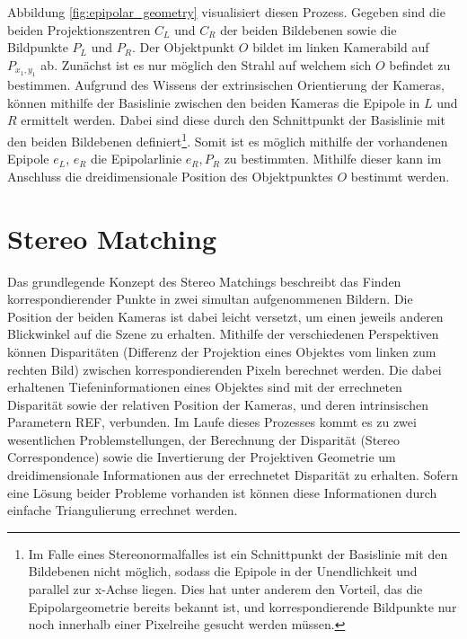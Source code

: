 Abbildung \ref{fig:epipolar_geometry} visualisiert diesen Prozess. Gegeben sind die beiden Projektionszentren $C_L$ und $C_R$ der beiden Bildebenen sowie die Bildpunkte $P_L$ und $P_R$. Der Objektpunkt $O$ bildet im linken Kamerabild auf $P_{x_1,y_1}$ ab. Zunächst ist es nur möglich den Strahl auf welchem sich $O$ befindet zu bestimmen. Aufgrund des Wissens der extrinsischen Orientierung der Kameras, können mithilfe der Basislinie zwischen den beiden Kameras die Epipole in $L$ und $R$ ermittelt werden. Dabei sind diese durch den Schnittpunkt der Basislinie mit den beiden Bildebenen definiert\footnote{Im Falle eines Stereonormalfalles ist ein Schnittpunkt der Basislinie mit den Bildebenen nicht möglich, sodass die Epipole in der Unendlichkeit und parallel zur x-Achse liegen. Dies hat unter anderem den Vorteil, das die Epipolargeometrie bereits bekannt ist, und korrespondierende Bildpunkte nur noch innerhalb einer Pixelreihe gesucht werden müssen.}. Somit ist es möglich mithilfe der vorhandenen Epipole $e_L$, $e_R$ die Epipolarlinie $e_R,P_R$ zu bestimmten. Mithilfe dieser kann im Anschluss die dreidimensionale Position des Objektpunktes $O$ bestimmt werden.

\section{Stereo Matching}
\label{sec:stereo_matching}
Das grundlegende Konzept des Stereo Matchings beschreibt das Finden korrespondierender Punkte in zwei simultan aufgenommenen Bildern. Die Position der beiden Kameras ist dabei leicht versetzt, um einen jeweils anderen Blickwinkel auf die Szene zu erhalten. Mithilfe der verschiedenen Perspektiven können Disparitäten (Differenz der Projektion eines Objektes vom linken zum rechten Bild) zwischen korrespondierenden Pixeln berechnet werden. Die dabei erhaltenen Tiefeninformationen eines Objektes sind mit der errechneten Disparität sowie der relativen Position der Kameras, und deren intrinsischen Parametern REF, verbunden. Im Laufe dieses Prozesses kommt es zu zwei wesentlichen Problemstellungen, der Berechnung der Disparität (Stereo Correspondence) sowie die Invertierung der Projektiven Geometrie um dreidimensionale Informationen aus der errechnetet Disparität zu erhalten. Sofern eine Lösung beider Probleme vorhanden ist können diese Informationen durch einfache Triangulierung errechnet werden.


